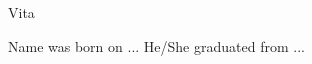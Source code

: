 \vspace*{0.5mm}
\begin{center}
\large{Vita}
\end{center}

\vspace*{1cm}
\begin{minipage}[t]{6in}
\setlength{\parindent}{0mm}
Name was born on ... He/She graduated from ...
\end{minipage}

